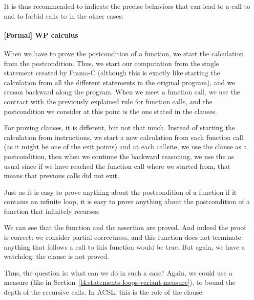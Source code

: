 

It is thus recommended to indicate the precise behaviors that can lead
to a call to  and to forbid calls to  in the
other cases:




\paragraph*{[Formal] WP calculus}


When we have to prove the postcondition of a function, we start the calculation
from the postcondition. Thus, we start our computation from the single
 statement created by Frama-C (although this is exactly like
starting the calculation from all the different  statements in the
original program), and we reason backward along the program. When we meet a
function call, we use the contract with the previously explained rule for
function calls, and the postcondition we consider at this point is
the one stated in the  clauses.


For proving  clauses, it is different, but not that much.
Instead of starting the calculation from  instructions, we start
a new calculation from each function call (as it might be one of the exit points)
and at each callsite, we use the  clause as a postcondition, then
when we continue the backward reasoning, we use the  as
usual since if we have reached the function call where we started from, that
means that previous calls did not exit.




Just as it is easy to prove anything about the postcondition of a function if it
contains an infinite loop, it is easy to prove anything about the postcondition
of a function that infinitely recurses:






We can see that the function and the assertion are proved. And indeed the
proof is correct: we consider partial correctness, and this function
does not terminate: anything that follows a call to this function would
be true. But again, we have a watchdog: the  clause is
not proved.


Thus, the question is: what can we do in such a case? Again, we could use
a measure (like in Section~\ref{l4:statements-loops-variant-measure}), to
bound the depth of the recursive calls. In ACSL, this is the role of the
 clause:



